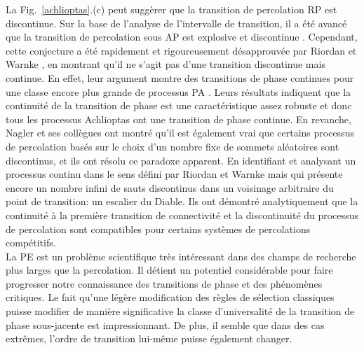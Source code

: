  La Fig.~\ref{achlioptas}.(c) peut suggèrer que la transition de percolation RP est discontinue. Sur la base de l’analyse de l’intervalle de transition, il a été avancé que la transition de percolation sous AP est explosive et discontinue \cite{Achlioptas-al2009}.
Cependant, cette conjecture a été rapidement et  rigoureusement désapprouvée par Riordan et Warnke \cite{Riordan-Warnke2011,Riordan-Warnke2012}, en montrant qu'il ne s'agit pas d'une transition discontinue  mais continue. En effet, leur argument montre des transitions de phase continues pour une classe encore plus grande de processus PA \cite{Riordan-Warnke2012}. Leurs résultats indiquent que la continuité de la transition de phase est une caractéristique assez robuste et donc tous les processus Achlioptas ont une transition de phase continue. En revanche, Nagler et ses collègues \cite{Nagler-al2012} ont montré qu'il est également vrai que certains processus de percolation basés sur le choix d'un nombre fixe de sommets aléatoires sont discontinus, et ils ont résolu ce paradoxe apparent. En identifiant et analysant un processus  continu dans le sens défini par Riordan et Warnke \cite{Riordan-Warnke2012} mais qui présente encore un nombre infini de sauts discontinus dans un voisinage arbitraire du point de transition: un escalier du Diable. Ils ont démontré analytiquement que la continuité à la première transition de connectivité et la discontinuité du processus de percolation sont compatibles pour certains systèmes de percolations compétitifs.\\
La PE est un problème scientifique très intéressant dans des champs de recherche plus larges que la percolation. Il détient un potentiel considérable pour faire progresser notre connaissance des transitions de phase et des phénomènes critiques. Le fait qu'une légère modification des règles de sélection classiques puisse modifier de manière significative la classe d'universalité de la transition de phase sous-jacente est impressionnant. De plus, il semble que dans des cas extrêmes, l'ordre de transition lui-même puisse également changer.

